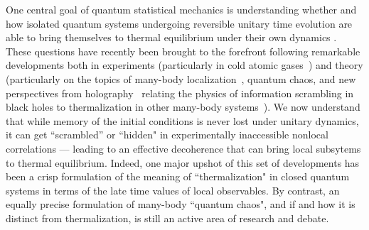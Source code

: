\documentclass[aps,prl,reprint,superscriptaddress, longbibliography]{revtex4-1}
\begin{document}
One central goal of quantum statistical mechanics is understanding whether and how isolated quantum systems
undergoing reversible unitary time evolution are able to bring themselves to thermal equilibrium under their own dynamics \cite{Deutsch,Srednicki, Rigol}.  These questions have recently been brought to the forefront following remarkable developments both in experiments (particularly in cold atomic gases~\cite{BlochRMP, Choi2016,Smith2015,KaufmanEntanglement}) and theory (particularly on the topics of many-body localization~\cite{Anderson58, Basko06,  PalHuse,OganesyanHuse, Znidaric,Imbrie2016}, quantum chaos, and new perspectives from holography~\cite{Maldacena_holo, Witten_holo} relating the  physics of information scrambling in black holes to thermalization in other many-body systems~\cite{HaydenPreskill,SekinoSusskind,HosurYoshida,ShenkerStanfordButterfly,Lashkari,LocalizedShocks,CotlerRM, RobertsStanford,KitaevSYK, SachdevSYK}).  We now understand that while memory of the initial conditions is never lost under unitary dynamics, it can get ``scrambled'' or ``hidden" in experimentally inaccessible nonlocal correlations --- leading to an effective  decoherence that can bring local subsytems to thermal equilibrium.  Indeed, one major upshot of this set of developments has been a crisp formulation of the meaning of ``thermalization" in closed quantum systems in terms of the late time values of local observables. By contrast, an equally precise formulation of many-body ``quantum chaos", and if and how it is distinct from thermalization, is still an active area of research and debate. 
\end{document}
